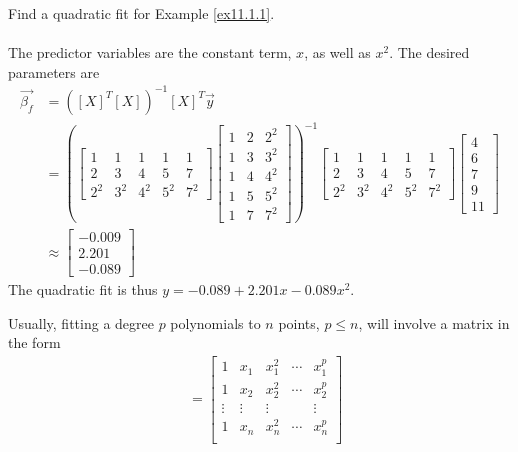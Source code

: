 \begin{exmp}
Find a quadratic fit for Example \ref{ex11.1.1}.\\
\\
The predictor variables are the constant term, $x$, as well as $x^2$. The desired parameters are
\begin{align*}
\vec{\beta_f} &= ([X]^T[X])^{-1}[X]^T \vec{y} \\
&=
\left(
\begin{bmatrix}
1 & 1 & 1 & 1 & 1 \\
2 & 3 & 4 & 5 & 7 \\
2^2 & 3^2 & 4^2 & 5^2 & 7^2
\end{bmatrix}
\begin{bmatrix}
1 & 2 & 2^2 \\
1 & 3 & 3^2 \\
1 & 4 & 4^2 \\
1 & 5 & 5^2 \\
1 & 7 & 7^2 
\end{bmatrix}
\right)^{-1}
\begin{bmatrix}
1 & 1 & 1 & 1 & 1 \\
2 & 3 & 4 & 5 & 7 \\
2^2 & 3^2 & 4^2 & 5^2 & 7^2
\end{bmatrix}
\begin{bmatrix}
4 \\
6 \\
7 \\
9 \\
11
\end{bmatrix} \\
& \approx
\begin{bmatrix}
-0.009 \\
2.201 \\
-0.089 
\end{bmatrix}
\end{align*}
The quadratic fit is thus $y = -0.089 + 2.201x - 0.089x^2$.
\end{exmp}
Usually, fitting a degree $p$ polynomials to $n$ points, $p \leq n$, will involve a matrix in the form
\begin{align*}
[X]
&= 
\begin{bmatrix}
1 & x_1 & x_1^2 & \cdots & x_1^p \\
1 & x_2 & x_2^2 & \cdots & x_2^p \\
\vdots & \vdots & \vdots & & \vdots \\
1 & x_n & x_n^2 & \cdots & x_n^p \\
\end{bmatrix} 
\end{align*}
